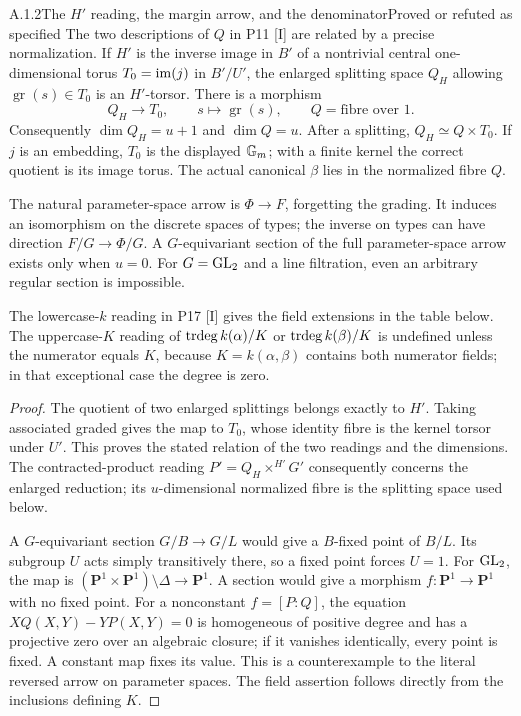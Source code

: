 \begin{result}{A.1.2}{The $H'$ reading, the margin arrow, and the denominator}{Proved or refuted as specified}
The two descriptions of $Q$ in P11 [I] are related by a precise
normalization. If $H'$ is the inverse image in $B'$ of a nontrivial
central one-dimensional torus $T_0=\operatorname{im}(j)$ in $B'/U'$, the enlarged
splitting space $Q_H$ allowing $\operatorname{gr}(s)\in T_0$ is an
$H'$-torsor. There is a morphism
\[
 Q_H\longrightarrow T_0,\qquad s\longmapsto\operatorname{gr}(s),
 \qquad Q=\text{fibre over }1.
\]
Consequently $\dim Q_H=u+1$ and $\dim Q=u$. After a splitting,
$Q_H\simeq Q\times T_0$. If $j$ is an embedding, $T_0$ is the displayed
$\mathbb G_m$; with a finite kernel the correct quotient is its image torus.
The actual canonical $\beta$ lies in the normalized fibre $Q$.

The natural parameter-space arrow is $\Phi\to F$, forgetting the
grading. It induces an isomorphism on the discrete spaces of types;
the inverse on types can have direction $F/G\to\Phi/G$. A
$G$-equivariant section of the full parameter-space arrow exists only
when $u=0$. For $G=\operatorname{GL}_2$ and a line filtration, even an arbitrary
regular section is impossible.

The lowercase-$k$ reading in P17 [I] gives the field extensions in the
table below. The uppercase-$K$ reading of $\operatorname{trdeg} k(\alpha)/K$ or
$\operatorname{trdeg} k(\beta)/K$ is undefined unless the numerator equals $K$,
because $K=k(\alpha,\beta)$ contains both numerator fields; in that
exceptional case the degree is zero.
\end{result}

\begin{proof}
The quotient of two enlarged splittings belongs exactly to $H'$.
Taking associated graded gives the map to $T_0$, whose identity fibre
is the kernel torsor under $U'$. This proves the stated relation of
the two readings and the dimensions. The contracted-product reading
$P'=Q_H\times^{H'}G'$ consequently concerns the enlarged reduction;
its $u$-dimensional normalized fibre is the splitting space used below.

A $G$-equivariant section $G/B\to G/L$ would give a $B$-fixed point
of $B/L$. Its subgroup $U$ acts simply transitively there, so a fixed
point forces $U=1$. For $\operatorname{GL}_2$, the map is
$(\mathbf P^1\times\mathbf P^1)\setminus\Delta\to\mathbf P^1$.
A section would give a morphism $f:\mathbf P^1\to\mathbf P^1$ with
no fixed point. For a nonconstant $f=[P:Q]$, the equation
$XQ(X,Y)-YP(X,Y)=0$ is homogeneous of positive degree and has a
projective zero over an algebraic closure; if it vanishes identically,
every point is fixed. A constant map fixes its value. This is a
counterexample to the literal reversed arrow on parameter spaces.
The field assertion follows directly from the inclusions defining $K$.
\end{proof}

